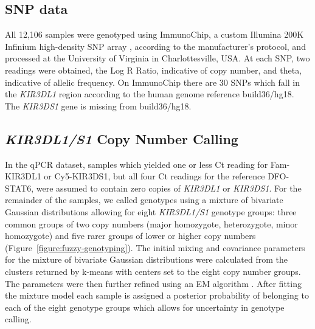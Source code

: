 \subsection{SNP data}

All 12,106 samples were genotyped using ImmunoChip, a custom Illumina 200K Infinium high-density SNP array \citep{immunochip},
according to the manufacturer's protocol, and processed at the University of Virginia in Charlottesville, USA.
At each SNP, two readings were obtained, the Log R Ratio, indicative of copy number, and theta, indicative of allelic frequency.
On ImmunoChip there are 30 SNPs which fall in the \emph{KIR3DL1} region according to the human genome reference build36/hg18.
The \emph{KIR3DS1} gene is missing from build36/hg18.



\subsection{\emph{KIR3DL1/S1} Copy Number Calling}

In the qPCR dataset, samples which yielded one or less Ct reading for Fam-KIR3DL1 or Cy5-KIR3DS1, but all four Ct readings for the reference DFO-STAT6,
were assumed to contain zero copies of \emph{KIR3DL1} or \emph{KIR3DS1}.
For the remainder of the samples, we called genotypes using a mixture of bivariate Gaussian distributions allowing for eight \emph{KIR3DL1/S1} genotype groups:
three common groups of two copy numbers (major homozygote, heterozygote, minor homozygote) and five rarer groups of lower or higher copy numbers (Figure~\ref{figure:fuzzy-genotyping}).
The initial mixing and covariance parameters for the mixture of bivariate Gaussian distributions were calculated from the clusters returned by k-means
with centers set to the eight copy number groups.
The parameters were then further refined using an EM algorithm \citep{Young:2009ty}.
After fitting the mixture model each sample is assigned a posterior probability of belonging to each of the eight genotype groups which allows for uncertainty in genotype calling.

